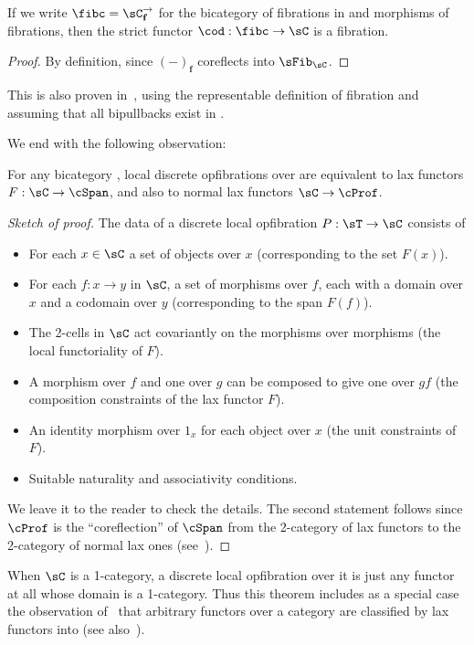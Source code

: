 \documentclass{amsart}
\def\f{_{\mathbf{f}}}
\begin{document}
\begin{thm}
  If we write $\fibc=\sC^\to\f$ for the bicategory of fibrations in \sC and morphisms of fibrations, then
  the strict functor $\cod : \fibc \to \sC$ is a fibration.
\end{thm}
\begin{proof}
  By definition, since $(-)\f$ coreflects into $\sFib_\sC$.
\end{proof}

This is also proven in~\cite[Example 3.4.6]{buckley:2fib}, using the representable definition of fibration and assuming that all bipullbacks exist in \sC.

We end with the following observation:

\begin{thm}\label{thm:ldopf-span}
  For any bicategory \sC, local discrete opfibrations over \sC are equivalent to lax functors $F:\sC \to \cSpan$, and also to normal lax functors $\sC\to\cProf$.
\end{thm}
\begin{proof}[Sketch of proof]
  The data of a discrete local opfibration $P:\sT\to\sC$ consists of
  \begin{itemize}
  \item For each $x\in \sC$ a set of objects over $x$ (corresponding to the set $F(x)$).
  \item For each $f:x\to y$ in $\sC$, a set of morphisms over $f$, each with a domain over $x$ and a codomain over $y$ (corresponding to the span $F(f)$).
  \item The 2-cells in $\sC$ act covariantly on the morphisms over morphisms (the local functoriality of $F$).
  \item A morphism over $f$ and one over $g$ can be composed to give one over $gf$ (the composition constraints of the lax functor $F$).
  \item An identity morphism over $1_x$ for each object over $x$ (the unit constraints of $F$).
  \item Suitable naturality and associativity conditions.
  \end{itemize}
  We leave it to the reader to check the details.
  The second statement follows since $\cProf$ is the ``coreflection'' of $\cSpan$ from the 2-category of lax functors to the 2-category of normal lax ones (see~\cite[Prop.5.14]{cs:multicats}).
\end{proof}

When $\sC$ is a 1-category, a discrete local opfibration over it is just any functor at all whose domain is a 1-category.
Thus this theorem includes as a special case the observation of~\cite{benabou:dist-at-work} that arbitrary functors over a category are classified by lax functors into \cSpan (see also~\cite{street:powerful,al:displayed}).
\end{document}
